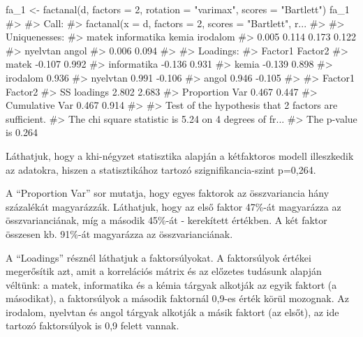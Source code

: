 \documentclass[
  letterpaper,
]{krantz}
\makeatletter
\newenvironment{Shaded}{\begin{snugshade}}{\end{snugshade}}
\newcommand{\AttributeTok}[1]{\textcolor[rgb]{0.40,0.45,0.13}{#1}}
\newcommand{\CommentTok}[1]{\textcolor[rgb]{0.37,0.37,0.37}{#1}}
\newcommand{\DecValTok}[1]{\textcolor[rgb]{0.68,0.00,0.00}{#1}}
\newcommand{\FunctionTok}[1]{\textcolor[rgb]{0.28,0.35,0.67}{#1}}
\newcommand{\NormalTok}[1]{\textcolor[rgb]{0.00,0.23,0.31}{#1}}
\newcommand{\OtherTok}[1]{\textcolor[rgb]{0.00,0.23,0.31}{#1}}
\newcommand{\StringTok}[1]{\textcolor[rgb]{0.13,0.47,0.30}{#1}}
\newenvironment{kframe}{%
\medskip{}
\setlength{\fboxsep}{.8em}
 \def\at@end@of@kframe{}%
 \ifinner\ifhmode%
  \def\at@end@of@kframe{\end{minipage}}%
  \begin{minipage}{\columnwidth}%
 \fi\fi%
 \def\FrameCommand##1{\hskip\@totalleftmargin \hskip-\fboxsep
 \colorbox{shadecolor}{##1}\hskip-\fboxsep
     \hskip-\linewidth \hskip-\@totalleftmargin \hskip\columnwidth}%
 \MakeFramed {\advance\hsize-\width
   \@totalleftmargin\z@ \linewidth\hsize
   \@setminipage}}%
 {\par\unskip\endMakeFramed%
 \at@end@of@kframe}
\renewenvironment{Shaded}{\begin{kframe}}{\end{kframe}}
\makeatother
\begin{document}
\begin{Shaded}
\begin{Highlighting}[]
\NormalTok{fa\_1 }\OtherTok{\textless{}{-}} \FunctionTok{factanal}\NormalTok{(d, }\AttributeTok{factors =} \DecValTok{2}\NormalTok{, }\AttributeTok{rotation =} \StringTok{"varimax"}\NormalTok{, }\AttributeTok{scores =} \StringTok{"Bartlett"}\NormalTok{)}
\NormalTok{fa\_1}
\CommentTok{\#\textgreater{} }
\CommentTok{\#\textgreater{} Call:}
\CommentTok{\#\textgreater{} factanal(x = d, factors = 2, scores = "Bartlett", r...}
\CommentTok{\#\textgreater{} }
\CommentTok{\#\textgreater{} Uniquenesses:}
\CommentTok{\#\textgreater{}       matek informatika       kemia    irodalom }
\CommentTok{\#\textgreater{}       0.005       0.114       0.173       0.122 }
\CommentTok{\#\textgreater{}    nyelvtan       angol }
\CommentTok{\#\textgreater{}       0.006       0.094 }
\CommentTok{\#\textgreater{} }
\CommentTok{\#\textgreater{} Loadings:}
\CommentTok{\#\textgreater{}             Factor1 Factor2}
\CommentTok{\#\textgreater{} matek       {-}0.107   0.992 }
\CommentTok{\#\textgreater{} informatika {-}0.136   0.931 }
\CommentTok{\#\textgreater{} kemia       {-}0.139   0.898 }
\CommentTok{\#\textgreater{} irodalom     0.936         }
\CommentTok{\#\textgreater{} nyelvtan     0.991  {-}0.106 }
\CommentTok{\#\textgreater{} angol        0.946  {-}0.105 }
\CommentTok{\#\textgreater{} }
\CommentTok{\#\textgreater{}                Factor1 Factor2}
\CommentTok{\#\textgreater{} SS loadings      2.802   2.683}
\CommentTok{\#\textgreater{} Proportion Var   0.467   0.447}
\CommentTok{\#\textgreater{} Cumulative Var   0.467   0.914}
\CommentTok{\#\textgreater{} }
\CommentTok{\#\textgreater{} Test of the hypothesis that 2 factors are sufficient.}
\CommentTok{\#\textgreater{} The chi square statistic is 5.24 on 4 degrees of fr...}
\CommentTok{\#\textgreater{} The p{-}value is 0.264}
\end{Highlighting}
\end{Shaded}

Láthatjuk, hogy a khi-négyzet statisztika alapján a kétfaktoros modell
illeszkedik az adatokra, hiszen a statisztikához tartozó
szignifikancia-szint p=0,264.

A ``Proportion Var'' sor mutatja, hogy egyes faktorok az összvariancia
hány százalékát magyarázzák. Láthatjuk, hogy az első faktor 47\%-át
magyarázza az összvarianciának, míg a második 45\%-át - kerekített
értékben. A két faktor összesen kb. 91\%-át magyarázza az
összvarianciának.

A ``Loadings'' résznél láthatjuk a faktorsúlyokat. A faktorsúlyok
értékei megerősítik azt, amit a korrelációs mátrix és az előzetes
tudásunk alapján véltünk: a matek, informatika és a kémia tárgyak
alkotják az egyik faktort (a másodikat), a faktorsúlyok a második
faktornál 0,9-es érték körül mozognak. Az irodalom, nyelvtan és angol
tárgyak alkotják a másik faktort (az elsőt), az ide tartozó faktorsúlyok
is 0,9 felett vannak.
\end{document}
